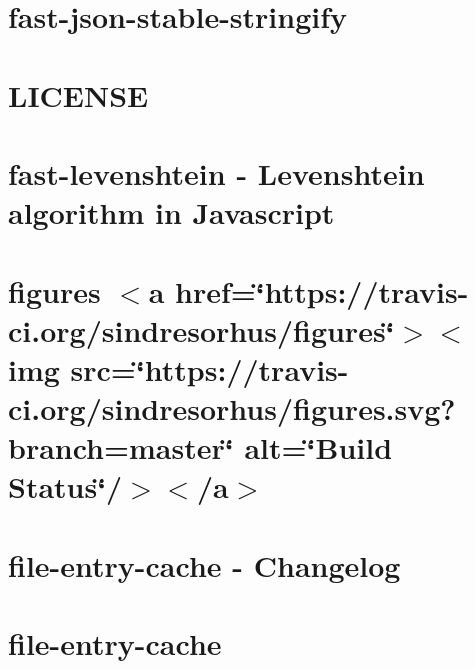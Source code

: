 \let\mypdfximage\pdfximage\def\pdfximage{\immediate\mypdfximage}\documentclass[twoside]{book}
\newcommand{\+}{\discretionary{\mbox{\scriptsize$\hookleftarrow$}}{}{}}
\begin{document}
\chapter{fast-\/json-\/stable-\/stringify}
\label{md_heap-visualizer_node_modules_fast-json-stable-stringify__r_e_a_d_m_e}

\chapter{L\+I\+C\+E\+N\+SE}
\label{md_heap-visualizer_node_modules_fast-levenshtein__l_i_c_e_n_s_e}

\chapter{fast-\/levenshtein -\/ Levenshtein algorithm in Javascript}
\label{md_heap-visualizer_node_modules_fast-levenshtein__r_e_a_d_m_e}

\chapter{figures $<$a href=\char`\"{}https\+://travis-\/ci.\+org/sindresorhus/figures\char`\"{}$>$$<$img src=\char`\"{}https\+://travis-\/ci.\+org/sindresorhus/figures.\+svg?branch=master\char`\"{} alt=\char`\"{}\+Build Status\char`\"{}/$>$$<$/a$>$}
\label{md_heap-visualizer_node_modules_figures_readme}

\chapter{file-\/entry-\/cache -\/ Changelog}
\label{md_heap-visualizer_node_modules_file-entry-cache_changelog}

\chapter{file-\/entry-\/cache}
\label{md_heap-visualizer_node_modules_file-entry-cache__r_e_a_d_m_e}

\end{document}
